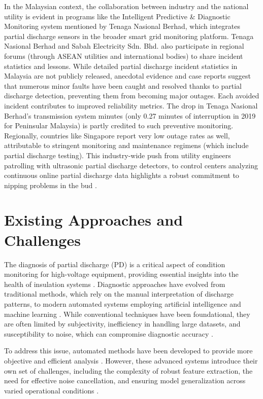 In the Malaysian context, the collaboration between industry and the national utility is evident in programs like the Intelligent Predictive \& Diagnostic Monitoring system mentioned by Tenaga Nasional Berhad, which integrates partial discharge sensors in the broader smart grid monitoring platform. Tenaga Nasional Berhad and Sabah Electricity Sdn. Bhd. also participate in regional forums (through ASEAN utilities and international bodies) to share incident statistics and lessons. While detailed partial discharge incident statistics in Malaysia are not publicly released, anecdotal evidence and case reports suggest that numerous minor faults have been caught and resolved thanks to partial discharge detection, preventing them from becoming major outages. Each avoided incident contributes to improved reliability metrics. The drop in Tenaga Nasional Berhad's transmission system minutes (only 0.27 minutes of interruption in 2019 for Peninsular Malaysia) is partly credited to such preventive monitoring. Regionally, countries like Singapore report very low outage rates as well, attributable to stringent monitoring and maintenance regimens (which include partial discharge testing). This industry-wide push from utility engineers patrolling with ultrasonic partial discharge detectors, to control centers analyzing continuous online partial discharge data highlights a robust commitment to nipping problems in the bud \parencite{Abdullah_2019, Alshalawi_2024}.

\section{Existing Approaches and Challenges}

The diagnosis of partial discharge (PD) is a critical aspect of condition monitoring for high-voltage equipment, providing essential insights into the health of insulation systems \parencite{Hussain_2021}. Diagnostic approaches have evolved from traditional methods, which rely on the manual interpretation of discharge patterns, to modern automated systems employing artificial intelligence and machine learning \parencite{Masud_2016}. While conventional techniques have been foundational, they are often limited by subjectivity, inefficiency in handling large datasets, and susceptibility to noise, which can compromise diagnostic accuracy \parencite{Florkowski_2021, Das_2023}.

To address this issue, automated methods have been developed to provide more objective and efficient analysis \parencite{Lu_2020_2}. However, these advanced systems introduce their own set of challenges, including the complexity of robust feature extraction, the need for effective noise cancellation, and ensuring model generalization across varied operational conditions \parencite{Friebe_2024, Long_2024}.


